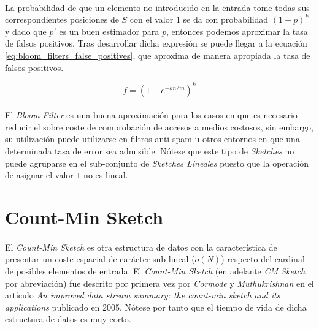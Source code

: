 \documentclass{subfiles}
\begin{document}
      \paragraph{}
      La probabilidad de que un elemento no introducido en la entrada tome todas sus correspondientes posiciones de $S$ con el valor $1$ se da con probabilidad $(1-p)^k$ y dado que $p'$ es un buen estimador para $p$, entonces podemos aproximar la tasa de falsos positivos. Tras desarrollar dicha expresión se puede llegar a la ecuación \eqref{eq:bloom_filters_false_positives}, que aproxima de manera apropiada la tasa de falsos positivos.

      \begin{equation}
      \label{eq:bloom_filters_false_positives}
        f = (1-e^{-kn/m})^k
      \end{equation}

      \paragraph{}
      El \emph{Bloom-Filter} es una buena aproximación para los casos en que es necesario reducir el sobre coste de comprobación de accesos a medios costosos, sin embargo, su utilización puede utilizarse en filtros anti-spam u otros entornos en que una determinada tasa de error sea admisible. Nótese que este tipo de \emph{Sketches} no puede agruparse en el sub-conjunto de \emph{Sketches Lineales} puesto que la operación de asignar el valor $1$ no es lineal.

    \section{Count-Min Sketch}
    \label{sec:count_min_sketch}

      \paragraph{}
      El \emph{Count-Min Sketch} es otra estructura de datos con la característica de presentar un coste espacial de carácter sub-lineal ($o(N)$) respecto del cardinal de posibles elementos de entrada. El \emph{Count-Min Sketch} (en adelante \emph{CM Sketch} por abreviación) fue descrito por primera vez por \emph{Cormode} y \emph{Muthukrishnan} en el artículo \emph{An improved data stream summary: the count-min sketch and its applications} \cite{cormode2005improved} publicado en 2005. Nótese por tanto que el tiempo de vida de dicha estructura de datos es muy corto.
\end{document}
